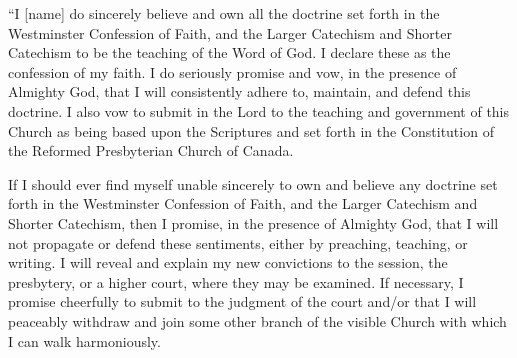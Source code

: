 \par {``I [name] do sincerely believe and own all the doctrine} set forth in the Westminster Confession of Faith, and the Larger Catechism and Shorter Catechism to be the teaching of the Word of God. I declare these as the confession of my faith. I do seriously promise and vow, in the presence of Almighty God, that I will consistently adhere to, maintain, and defend this doctrine. I also vow to submit in the Lord to the teaching and government of this Church as being based upon the Scriptures and set forth in the Constitution of the Reformed Presbyterian Church of Canada.

\par If I should ever find myself unable sincerely to own and believe any doctrine set forth in the Westminster Confession of Faith, and the Larger Catechism and Shorter Catechism, then I promise, in the presence of Almighty God, that I will not propagate or defend these sentiments, either by preaching, teaching, or writing. I will reveal and explain my new convictions to the session, the presbytery, or a higher court, where they may be examined. If necessary, I promise cheerfully to submit to the judgment of the court and/or that I will peaceably withdraw and join some other branch of the visible Church with which I can walk harmoniously.

